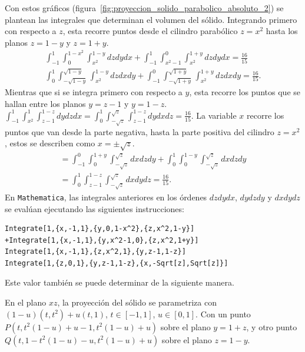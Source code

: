 Con estos gráficos (figura~\ref{fig:proyeccion_solido_parabolico_absoluto_2}) se plantean las integrales que determinan el volumen del sólido. Integrando primero con respecto a $z$, esta recorre puntos desde el cilindro parabólico $z=x^2$ hasta los planos $z=1-y$ y $z=1+y$.
\begin{multline*}
\int_{-1}^{1}\int_{0}^{1-x^2}\int_{x^2}^{1-y}dzdydx+\int_{-1}^{1}\int_{x^2-1}^{0}\int_{x^2}^{1+y}dzdydx= \frac{16}{15}\\
\int_0^1\int_{-\sqrt{1-y}}^{\sqrt{1-y}}\int_{x^2}^{1-y}dzdxdy+\int_{-1}^{0}\int_{-\sqrt{1+y}}^{\sqrt{1+y}}\int_{x^2}^{1+y}dzdxdy=\frac{16}{15}.
\end{multline*}
Mientras que si se integra primero con respecto a $y$,
esta recorre los puntos que se hallan entre los planos $y=z-1$ y $y=1-z$.
$\int_{-1}^{1}\int_{x^2}^{1}\int_{z-1}^{1-z}dydzdx=\int_{0}^{1}\int_{-\sqrt{z}}^{\sqrt{z}}\int_{z-1}^{1-z}dydxdz=\frac{16}{15}$.
La variable $x$ recorre los puntos que van desde la parte negativa, hasta la parte positiva del cilindro $z=x^2$,
estos se describen como $x=\pm \sqrt{z}$.
\begin{multline*} = \int_{-1}^{0}\int_{0}^{1+y}\int_{-\sqrt{z}}^{\sqrt{z}}dxdzdy+ \int_{0}^{1}\int_{0}^{1-y}\int_{-\sqrt{z}}^{\sqrt{z}}dxdzdy \\
=\int_{0}^{1}\int_{z-1}^{1-z}\int_{-\sqrt{z}}^{\sqrt{z}}dxdydz= \frac{16}{15}.
\end{multline*}
En \verb"Mathematica", las integrales anteriores en los órdenes $dzdydx$, $dydzdy$ y $dxdydz$
se evalúan ejecutando las siguientes instrucciones:

\begin{tcolorbox}[title=\bf Instrucción en \verb"Mathematica"]\begin{Verbatim}[formatcom=\letraverbatim]
Integrate[1,{x,-1,1},{y,0,1-x^2},{z,x^2,1-y}]
+Integrate[1,{x,-1,1},{y,x^2-1,0},{z,x^2,1+y}]
Integrate[1,{x,-1,1},{z,x^2,1},{y,z-1,1-z}]
Integrate[1,{z,0,1},{y,z-1,1-z},{x,-Sqrt[z],Sqrt[z]}]
\end{Verbatim}
\end{tcolorbox}

Este valor también se puede determinar de la siguiente manera.

En el plano $xz$, la proyección del sólido se parametriza con
$(1-u)(t,t^2)+u(t,1)$, $t\in [-1,1]$, $u\in [0,1]$.
Con un punto $P(t,t^2(1-u)+u-1,t^2(1-u)+u) $ sobre el plano $y=1+z$, y otro punto $Q(t,1-t^2(1-u)-u,t^2(1-u)+u) $ sobre el plano $z=1-y$.

